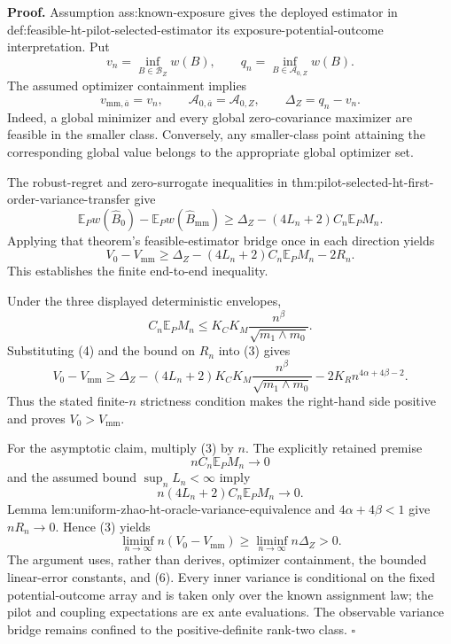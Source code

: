 \textbf{Proof.}
Assumption ass:known-exposure gives the deployed estimator in def:feasible-ht-pilot-selected-estimator its exposure-potential-outcome interpretation.  Put
\[
v_n=\inf_{B\in\mathcal B_Z}w(B),
\qquad
q_n=\inf_{B\in\mathcal A_{0,Z}}w(B).
\]
The assumed optimizer containment implies
\[
v_{\mathrm{mm},\overline a}=v_n,
\qquad
\mathcal A_{0,\overline a}=\mathcal A_{0,Z},
\qquad
\Delta_Z=q_n-v_n.
\tag{1}
\]
Indeed, a global minimizer and every global zero-covariance maximizer are feasible in the smaller class.  Conversely, any smaller-class point attaining the corresponding global value belongs to the appropriate global optimizer set.

The robust-regret and zero-surrogate inequalities in thm:pilot-selected-ht-first-order-variance-transfer give
\[
\mathbb E_Pw(\widehat B_0)-\mathbb E_Pw(\widehat B_{\mathrm{mm}})
\ge\Delta_Z-(4L_n+2)C_n\mathbb E_PM_n.
\tag{2}
\]
Applying that theorem's feasible-estimator bridge once in each direction yields
\[
V_0-V_{\mathrm{mm}}
\ge\Delta_Z-(4L_n+2)C_n\mathbb E_PM_n-2R_n.
\tag{3}
\]
This establishes the finite end-to-end inequality.

Under the three displayed deterministic envelopes,
\[
C_n\mathbb E_PM_n
\le K_CK_M\frac{n^\beta}{\sqrt{m_1\wedge m_0}}.
\tag{4}
\]
Substituting (4) and the bound on \(R_n\) into (3) gives
\[
V_0-V_{\mathrm{mm}}
\ge \Delta_Z
-(4L_n+2)K_CK_M\frac{n^\beta}{\sqrt{m_1\wedge m_0}}
-2K_Rn^{4\alpha+4\beta-2}.
\tag{5}
\]
Thus the stated finite-\(n\) strictness condition makes the right-hand side positive and proves \(V_0>V_{\mathrm{mm}}\).

For the asymptotic claim, multiply (3) by \(n\).  The explicitly retained premise
\[
nC_n\mathbb E_PM_n\longrightarrow0
\tag{6}
\]
and the assumed bound \(\sup_nL_n<\infty\) imply
\[
n(4L_n+2)C_n\mathbb E_PM_n\longrightarrow0.
\tag{7}
\]
Lemma lem:uniform-zhao-ht-oracle-variance-equivalence and \(4\alpha+4\beta<1\) give \(nR_n\to0\).  Hence (3) yields
\[
\liminf_{n\to\infty}n(V_0-V_{\mathrm{mm}})
\ge\liminf_{n\to\infty}n\Delta_Z>0.
\]
The argument uses, rather than derives, optimizer containment, the bounded linear-error constants, and (6).  Every inner variance is conditional on the fixed potential-outcome array and is taken only over the known assignment law; the pilot and coupling expectations are ex ante evaluations.  The observable variance bridge remains confined to the positive-definite rank-two class. \(\square\)